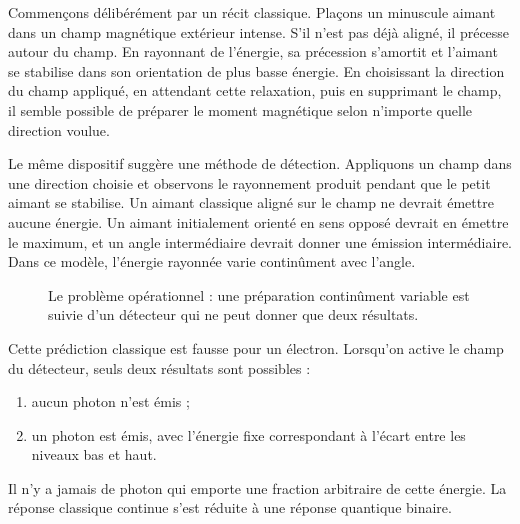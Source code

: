 Commençons délibérément par un récit classique. Plaçons un minuscule aimant dans un champ magnétique extérieur intense. S’il n’est pas déjà aligné, il précesse autour du champ. En rayonnant de l’énergie, sa précession s’amortit et l’aimant se stabilise dans son orientation de plus basse énergie. En choisissant la direction du champ appliqué, en attendant cette relaxation, puis en supprimant le champ, il semble possible de préparer le moment magnétique selon n’importe quelle direction voulue.

Le même dispositif suggère une méthode de détection. Appliquons un champ dans une direction choisie et observons le rayonnement produit pendant que le petit aimant se stabilise. Un aimant classique aligné sur le champ ne devrait émettre aucune énergie. Un aimant initialement orienté en sens opposé devrait en émettre le maximum, et un angle intermédiaire devrait donner une émission intermédiaire. Dans ce modèle, l’énergie rayonnée varie continûment avec l’angle.

\begin{figure}[htbp]
\centering
\begin{coursefitfigure}
\end{coursefitfigure}
\caption{Le problème opérationnel : une préparation continûment variable est suivie d’un détecteur qui ne peut donner que deux résultats.}
\end{figure}

Cette prédiction classique est fausse pour un électron. Lorsqu’on active le champ du détecteur, seuls deux résultats sont possibles :
\begin{enumerate}
  \item aucun photon n’est émis ;
  \item un photon est émis, avec l’énergie fixe correspondant à l’écart entre les niveaux bas et haut.
\end{enumerate}
Il n’y a jamais de photon qui emporte une fraction arbitraire de cette énergie. La réponse classique continue s’est réduite à une réponse quantique binaire.

